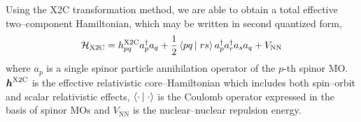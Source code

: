 Using the X2C transformation method, we are able to obtain a total effective
two--component Hamiltonian, which may be written in second quantized form,
\begin{equation}
\mathcal{H}_\mathrm{X2C} = h_{pq}^\mathrm{X2C}a_p^\dagger a_q + 
  \frac{1}{2} \left\langle pq \left\vert\right. rs \right\rangle a_p^\dagger a_r^\dagger a_s a_q + V_\mathrm{NN}
  \label{eq:X2CHam}
\end{equation}
where $a_p$ is a single spinor particle annihilation operator of the $p$-th
spinor MO. $\boldsymbol{h}^\mathrm{X2C}$ is the effective relativistic core--Hamiltonian
which includes both spin--orbit and scalar relativistic effects,
$\left\langle \cdot \left\vert\right. \cdot \right\rangle$ is the Coulomb operator expressed in the basis of spinor
MOs and $V_\mathrm{NN}$ is the nuclear--nuclear repulsion energy. 
